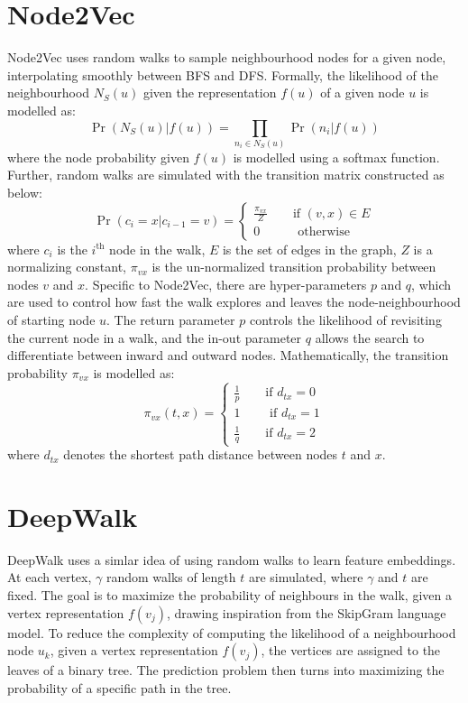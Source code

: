 \documentclass[sigconf]{acmart}
\begin{document}
\section{Node2Vec}
Node2Vec \cite{grover2016node2vec} uses random walks to sample neighbourhood nodes for a given node, interpolating smoothly between BFS and DFS. Formally, the likelihood of the neighbourhood $N_S(u)$ given the representation $f(u)$ of a given node $u$ is modelled as:
\begin{equation*}
    \Pr(N_S(u)|f(u)) = \prod_{n_i \in N_S(u)} \Pr(n_i|f(u))
\end{equation*}
where the node probability given $f(u)$ is modelled using a softmax function. Further, random walks are simulated with the transition matrix constructed as below:
\begin{equation*}
    \Pr(c_i=x | c_{i-1} = v) = 
    \begin{cases}
    \frac{\pi_{vx}}{Z} \qquad \text{if } (v, x) \in E\\
    0 \quad \qquad \text{otherwise}
    \end{cases}
\end{equation*}
where
$c_i$ is the $i^\text{th}$ node in the walk, $E$ is the set of edges in the graph, $Z$ is a normalizing constant, $\pi_{vx}$ is the un-normalized transition probability between nodes $v$ and $x$. Specific to Node2Vec, there are hyper-parameters $p$ and $q$, which are used to control how fast the walk explores and leaves the node-neighbourhood of starting node $u$. The return parameter $p$ controls the likelihood of revisiting the current node in a walk, and the in-out parameter $q$ allows the search to differentiate between inward and outward nodes. Mathematically, the transition probability $\pi_{vx}$ is modelled as:
\begin{equation*}
    \pi_{vx}(t, x) = 
    \begin{cases}
    \frac{1}{p} \qquad \text{if } d_{tx} = 0\\
    1 \qquad \text{ if } d_{tx} = 1\\
    \frac{1}{q} \qquad \text{if } d_{tx} = 2
    \end{cases}
\end{equation*}
where $d_{tx}$ denotes the shortest path distance between nodes $t$ and $x$.

\section{DeepWalk}
DeepWalk \cite{perozzi2014deepwalk} uses a simlar idea of using random walks to learn feature embeddings. At each vertex, $\gamma$ random walks of length $t$ are simulated, where $\gamma$ and $t$ are fixed. The goal is to maximize the probability of neighbours in the walk, given a vertex representation $f(v_j)$, drawing inspiration from the SkipGram language model. To reduce the complexity of computing the likelihood of a neighbourhood node $u_k$, given a vertex representation $f(v_j)$, the vertices are assigned to the leaves of a binary tree. The prediction problem then turns into maximizing the probability of a specific path in the tree. 
\end{document}
